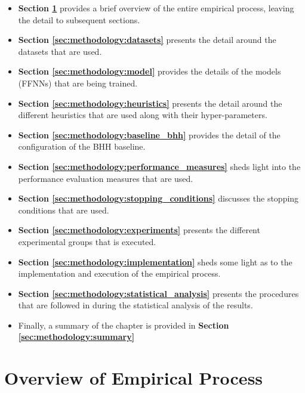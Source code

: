 \begin{itemize}
      \item \textbf{Section \ref{sec:methodology:overview}} provides a brief overview of the entire empirical process, leaving the detail to subsequent sections.

      \item \textbf{Section \ref{sec:methodology:datasets}} presents the detail around the datasets that are used.

      \item \textbf{Section \ref{sec:methodology:model}} provides the details of the models (\acs{FFNN}s) that are being trained.

      \item \textbf{Section \ref{sec:methodology:heuristics}} presents the detail around the different heuristics that are used along with their hyper-parameters.

      \item \textbf{Section \ref{sec:methodology:baseline_bhh}} provides the detail of the configuration of the \acs{BHH} baseline.

      \item \textbf{Section \ref{sec:methodology:performance_measures}} sheds light into the performance evaluation measures that are used.

      \item \textbf{Section \ref{sec:methodology:stopping_conditions}} discusses the stopping conditions that are used.

      \item \textbf{Section \ref{sec:methodology:experiments}} presents the different experimental groups that is executed.

      \item \textbf{Section \ref{sec:methodology:implementation}} sheds some light as to the implementation and execution of the empirical process.

      \item \textbf{Section \ref{sec:methodology:statistical_analysis}} presents the procedures that are followed in during the statistical analysis of the results.

      \item Finally, a summary of the chapter is provided in \textbf{Section \ref{sec:methodology:summary}}
\end{itemize}

\section{Overview of Empirical Process}
\label{sec:methodology:overview}

